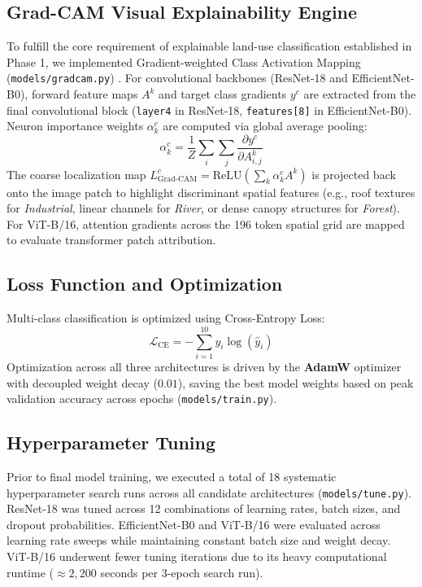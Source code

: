 \documentclass[11pt,a4paper]{article}
\begin{document}
\subsection{Grad-CAM Visual Explainability Engine}
To fulfill the core requirement of explainable land-use classification established in Phase 1, we implemented Gradient-weighted Class Activation Mapping (\texttt{models/gradcam.py}) \cite{selvaraju2017}. 
For convolutional backbones (ResNet-18 and EfficientNet-B0), forward feature maps $A^k$ and target class gradients $y^c$ are extracted from the final convolutional block (\texttt{layer4} in ResNet-18, \texttt{features[8]} in EfficientNet-B0). Neuron importance weights $\alpha_k^c$ are computed via global average pooling:
\begin{equation}
\alpha_k^c = \frac{1}{Z} \sum_{i} \sum_{j} \frac{\partial y^c}{\partial A_{i,j}^k}
\end{equation}
The coarse localization map $L_{\text{Grad-CAM}}^c = \text{ReLU}\left(\sum_k \alpha_k^c A^k\right)$ is projected back onto the image patch to highlight discriminant spatial features (e.g., roof textures for \textit{Industrial}, linear channels for \textit{River}, or dense canopy structures for \textit{Forest}). For ViT-B/16, attention gradients across the 196 token spatial grid are mapped to evaluate transformer patch attribution.

\subsection{Loss Function and Optimization}
Multi-class classification is optimized using Cross-Entropy Loss:
\begin{equation}
\mathcal{L}_{\text{CE}} = -\sum_{i=1}^{10} y_i \log(\hat{y}_i)
\end{equation}
Optimization across all three architectures is driven by the \textbf{AdamW} optimizer with decoupled weight decay ($0.01$), saving the best model weights based on peak validation accuracy across epochs (\texttt{models/train.py}).

\subsection{Hyperparameter Tuning}
Prior to final model training, we executed a total of 18 systematic hyperparameter search runs across all candidate architectures (\texttt{models/tune.py}). ResNet-18 was tuned across 12 combinations of learning rates, batch sizes, and dropout probabilities. EfficientNet-B0 and ViT-B/16 were evaluated across learning rate sweeps while maintaining constant batch size and weight decay. ViT-B/16 underwent fewer tuning iterations due to its heavy computational runtime ($\approx 2{,}200$ seconds per 3-epoch search run).
\end{document}
